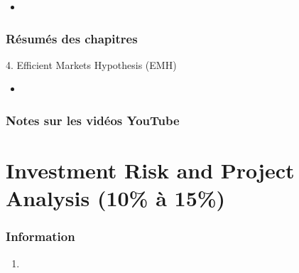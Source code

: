 \documentclass[12pt, titlepage, french]{report}
\begin{document}
\begin{YTB_vids}
\begin{itemize}
	\item	
\end{itemize}
\end{YTB_vids}

\subsection{Résumés des chapitres}

\begin{CHPT_SUMM_AUTO}[label = {L.-4}]{4. Efficient Markets Hypothesis (EMH)}
	\begin{itemize}
		\item	
	\end{itemize}
\end{CHPT_SUMM_AUTO}

\subsection{Notes sur les vidéos YouTube}


\newpage

\chapter[Investment Risk and Project Analysis]{Investment Risk and Project Analysis (10\% à 15\%)}

\subsection{Information}

\begin{distributions}[Objective]

\end{distributions}

\begin{outcomes}
\begin{enumerate}
	\item	
\end{enumerate}
\end{outcomes}
\end{document}
